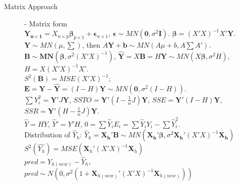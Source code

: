 \documentclass[10pt,landscape]{article}
\begin{document}
\begin{multicols}{3}
    
    
    \begin{description}
    		\item[Matrix Approach] - Matrix form \\ %
    		$\mathbf{Y_{n\times 1}} = X_{n\times p}\boldsymbol{\beta}_{p\times 1}+\boldsymbol{\epsilon}_{n\times 1}$, $\boldsymbol{\epsilon}\sim	MN(\textbf{0}, \sigma^2\textbf{I})$. $\boldsymbol{\beta} = (X'X)^{-1}X'\boldsymbol{Y}$. \\
    		$\boldsymbol{Y} \sim MN(\mu, \sum)$, then $A\boldsymbol{Y} + \boldsymbol{b} \sim MN(A\mu+b, A\sum A')$. \\
    		$\boldsymbol{B}\sim \boldsymbol{MN}(\boldsymbol{\beta}, \sigma^2(X'X)^{-1})$, $\boldsymbol{\hat{Y}} = X\textbf{B} = H\boldsymbol{Y}\sim MN(X\boldsymbol{\beta}, \sigma^2H)$, $H=X(X'X)^{-1}X'$.\\
    		$S^2(\boldsymbol{B}) = MSE(X'X)^{-1}$; $\boldsymbol{E} = \boldsymbol{Y} - \boldsymbol{\hat{Y}} = (I - H)\boldsymbol{Y} \sim	MN(\boldsymbol{0}, \sigma^2(I-H))$.\\
    		$\sum Y_i^2 = \boldsymbol{Y}'J\boldsymbol{Y}$, $SSTO = \boldsymbol{Y}'(I - \frac{1}{n}J)\boldsymbol{Y}$, $SSE = \boldsymbol{Y}'(I-H)\boldsymbol{Y}$, $SSR = \boldsymbol{Y}'(H-\frac{1}{n}J)\boldsymbol{Y}$.\\
    		$\hat{Y} = HY$, $\hat{Y}' = Y'H$, $0 = \sum \hat{Y}_iE_i = \sum \hat{Y}_i Y_i - \sum \hat{Y}_i^2$. \\
    		Distribution of $\hat{Y}_h$: $\hat{Y}_h = \boldsymbol{X_h'B}\sim MN(\boldsymbol{X_h'\beta}, \sigma^2\boldsymbol{X_h'}(X'X)^{-1}\boldsymbol{X_h})$ \\
    		$S^2(\hat{Y_h}) = MSE(\boldsymbol{X}_h'(X'X)^{-1}\boldsymbol{X}_h)$ \\
    		$pred = Y_{h(new)} - \hat{Y}_h$, $pred \sim N(0, \sigma^2(1 + \boldsymbol{X}_{h(new)}'(X'X)^{-1}\boldsymbol{X}_{h(new)}))$
    		
    \end{description}
    

\end{multicols}
\end{document}
